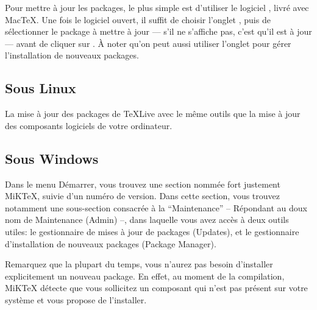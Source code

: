 Pour mettre à jour les packages, le plus simple est d'utiliser le logiciel , livré avec MacTeX. Une fois le logiciel ouvert, il suffit  de choisir l'onglet , puis de sélectionner le package à mettre à jour --- s'il ne s'affiche pas, c'est qu'il est à jour --- avant de cliquer sur . À noter qu'on peut aussi utiliser l'onglet  pour gérer l'installation de nouveaux packages.

\subsection{Sous Linux}

La mise à jour des packages de TeXLive avec le même outils que la mise à jour des composants logiciels de votre ordinateur.

\subsection{Sous Windows}

Dans le menu Démarrer, vous trouvez une section nommée fort justement MiKTeX, suivie d'un numéro de version. Dans cette section, vous trouvez notamment une sous-section consacrée à la \enquote{Maintenance} – Répondant au doux nom de Maintenance (Admin) –, dans laquelle vous avez accès à deux outils utiles: le gestionnaire de mises à jour de packages (Updates), et le gestionnaire d'installation de nouveaux packages (Package Manager).

Remarquez que la plupart du temps, vous n'aurez pas besoin d'installer explicitement un nouveau package. En effet, au moment de la compilation, MiKTeX détecte que vous sollicitez un composant qui n'est pas présent sur votre système et vous propose de l'installer.